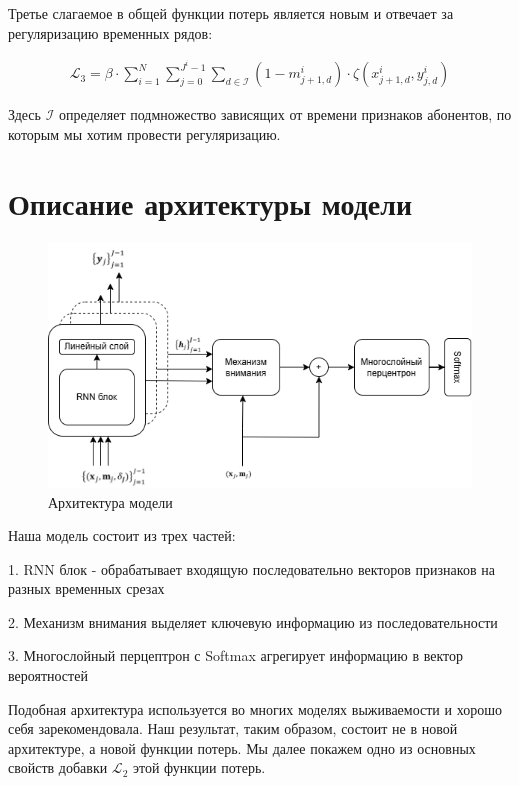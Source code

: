 \documentclass[a4paper,14pt,oneside,openany]{memoir}
\begin{document}
Третье слагаемое в общей функции потерь является новым и отвечает за регуляризацию временных рядов: 

\begin{equation}
	\begin{aligned}
		\mathcal{L}_3=\beta\cdot\sum_{i=1}^N\sum_{j=0}^{J^i-1}\sum_{d\in\mathcal{I}}(1-m_{j+1,d}^i)\cdot\zeta(x_{j+1,d}^i,y_{j,d}^i)	
	\end{aligned}
\end{equation}		

Здесь $\mathcal{I}$ определяет подмножество зависящих от времени признаков абонентов, по которым мы хотим провести регуляризацию. 

\section{Описание архитектуры модели}

\begin{figure}[H]
	\includegraphics[width=1\textwidth]{../figures/dynamic_deephit_scheme_only_architecture.png}
	\caption{Архитектура модели}
\end{figure}

Наша модель состоит из трех частей:

1. RNN блок - обрабатывает входящую последовательно векторов признаков на разных временных срезах

2. Механизм внимания выделяет ключевую информацию из последовательности

3. Многослойный перцептрон с Softmax агрегирует информацию в вектор вероятностей

Подобная архитектура используется во многих моделях выживаемости и хорошо себя зарекомендовала. Наш результат, таким образом, состоит не в новой архитектуре, а новой функции потерь. Мы далее покажем одно из основных свойств добавки $\mathcal{L}_2$ этой функции потерь.  
\end{document}
